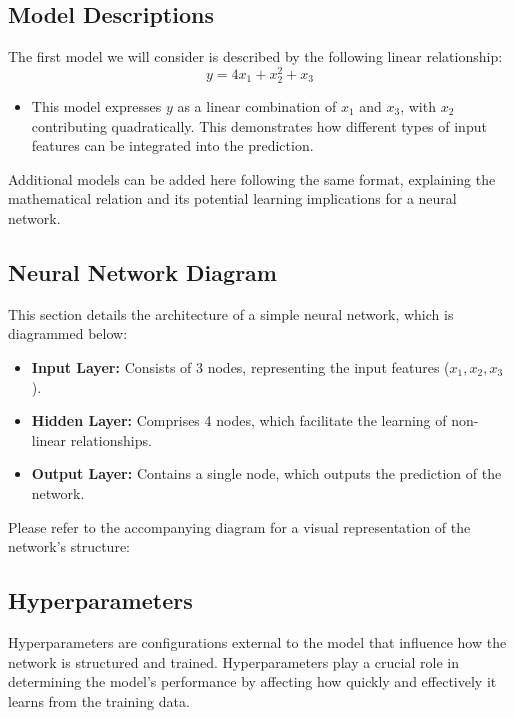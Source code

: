     \subsection*{Model Descriptions}
    The first model we will consider is described by the following linear relationship:
    \begin{equation}
        y = 4x_{1} + x_{2}^2 + x_{3}
    \end{equation}
    \begin{itemize}
        \item This model expresses \(y\) as a linear combination of \(x_1\) and \(x_3\), with \(x_2\) contributing quadratically. This demonstrates how different types of input features can be integrated into the prediction.
    \end{itemize}

    \vspace{5mm}

    \noindent Additional models can be added here following the same format, explaining the mathematical relation and its potential learning implications for a neural network.

    \subsection{Neural Network Diagram}
    This section details the architecture of a simple neural network, which is diagrammed below:
    \begin{itemize}
        \item \textbf{Input Layer:} Consists of 3 nodes, representing the input features ($x_1, x_2, x_3$).
        \item \textbf{Hidden Layer:} Comprises 4 nodes, which facilitate the learning of non-linear relationships.
        \item \textbf{Output Layer:} Contains a single node, which outputs the prediction of the network.
    \end{itemize}
    Please refer to the accompanying diagram for a visual representation of the network's structure:

    \subsection{Hyperparameters}
    Hyperparameters are configurations external to the model that influence how the network is structured and trained. Hyperparameters play a crucial role in determining the model's performance by affecting how quickly and effectively it learns from the training data.

